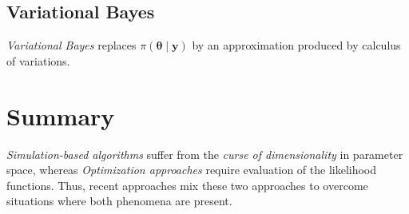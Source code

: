 \subsection{Variational Bayes}\label{sec15_22}
\textit{Variational Bayes} replaces $\pi(\boldsymbol{\theta} \mid \mathbf{y})$ by an approximation produced by calculus of variations. 

\section{Summary}\label{sec15_3}
\textit{Simulation-based algorithms} suffer from the \textit{curse of dimensionality} in parameter space, whereas \textit{Optimization approaches} require evaluation of the likelihood functions. Thus, recent approaches mix these two approaches to overcome situations where both phenomena are present.



